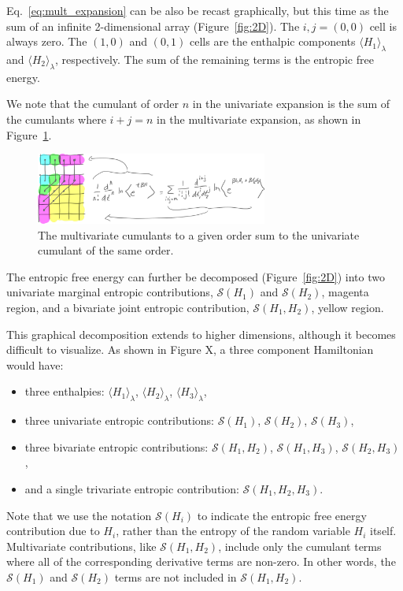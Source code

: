 \documentclass{article}
\begin{document}
Eq.~\ref{eq:mult_expansion} can be also be recast graphically, but this time as the sum of an infinite 2-dimensional array (Figure~\ref{fig:2D}). The $i,j=(0,0)$ cell is always zero. The $(1,0)$ and $(0,1)$ cells are the enthalpic components $\langle H_1 \rangle_\lambda$ and $\langle H_2 \rangle_\lambda$, respectively. The sum of the remaining terms is the entropic free energy. 

We note that the cumulant of order $n$ in the univariate expansion is the sum of the cumulants where $i+j=n$ in the multivariate expansion, as shown in Figure~\ref{fig:cumsum}.

\begin{figure}[htb]
\centering
\includegraphics[width=3in]{figure3.pdf}
\caption{The multivariate cumulants to a given order sum to the univariate cumulant of the same order.}
\label{fig:cumsum}
\end{figure}


The entropic free energy can further be decomposed (Figure~\ref{fig:2D}) into two univariate marginal entropic contributions, $\mathcal{S}(H_1)$ and $\mathcal{S}(H_2)$, magenta region, and a bivariate joint entropic contribution, $\mathcal{S}(H_1, H_2)$, yellow region.

This graphical decomposition extends to higher dimensions, although it becomes difficult to visualize. As shown in Figure X, a three component Hamiltonian would have:
\begin{itemize}
	\item three enthalpies: $\langle H_1 \rangle_\lambda$, $\langle H_2 \rangle_\lambda$, $\langle H_3 \rangle_\lambda$,
	\item three univariate entropic contributions: $\mathcal{S}(H_1)$, $\mathcal{S}(H_2)$, $\mathcal{S}(H_3)$,
	\item three bivariate entropic contributions: $\mathcal{S}(H_1, H_2)$, $\mathcal{S}(H_1, H_3)$, $\mathcal{S}(H_2, H_3)$, 
	\item and a single trivariate entropic contribution: $\mathcal{S}(H_1, H_2, H_3)$.
\end{itemize}

Note that we use the notation $\mathcal{S}(H_i)$ to indicate the entropic free energy contribution due to $H_i$, rather than the entropy of the random variable $H_i$ itself. Multivariate contributions, like $\mathcal{S}(H_1, H_2)$, include only the cumulant terms where all of the corresponding derivative terms are non-zero. In other words, the $\mathcal{S}(H_1)$ and $\mathcal{S}(H_2)$ terms are not included in $\mathcal{S}(H_1, H_2)$.
\end{document}
